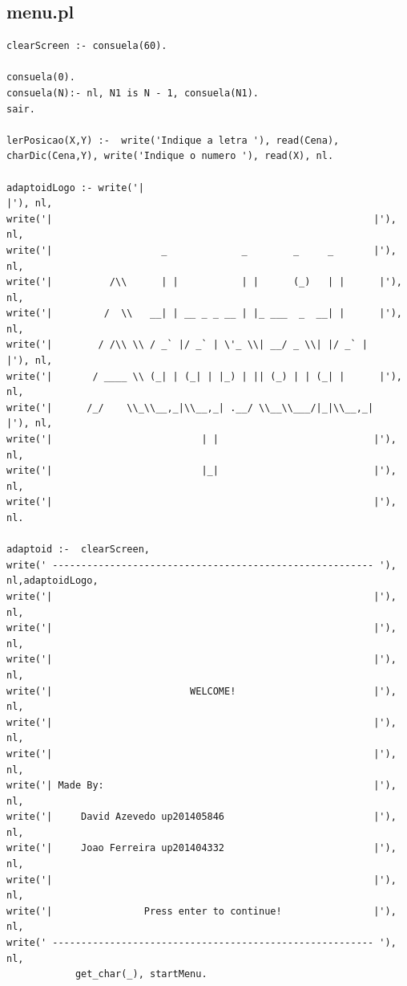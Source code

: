 \documentclass[a4paper]{article}
\begin{document}
\subsection{menu.pl}
\begin{lstlisting}
clearScreen :- consuela(60).

consuela(0).
consuela(N):- nl, N1 is N - 1, consuela(N1).
sair.

lerPosicao(X,Y) :-  write('Indique a letra '), read(Cena), charDic(Cena,Y), write('Indique o numero '), read(X), nl.

adaptoidLogo :- write('|                                                        |'), nl,
write('|                                                        |'), nl,
write('|                   _             _        _     _       |'), nl,
write('|          /\\      | |           | |      (_)   | |      |'), nl,
write('|         /  \\   __| | __ _ _ __ | |_ ___  _  __| |      |'), nl,
write('|        / /\\ \\ / _` |/ _` | \'_ \\| __/ _ \\| |/ _` |      |'), nl,
write('|       / ____ \\ (_| | (_| | |_) | || (_) | | (_| |      |'), nl,
write('|      /_/    \\_\\__,_|\\__,_| .__/ \\__\\___/|_|\\__,_|      |'), nl,
write('|                          | |                           |'), nl,
write('|                          |_|                           |'), nl,
write('|                                                        |'), nl.

adaptoid :-  clearScreen,
write(' -------------------------------------------------------- '), nl,adaptoidLogo,
write('|                                                        |'), nl,
write('|                                                        |'), nl,
write('|                                                        |'), nl,
write('|                        WELCOME!                        |'), nl,
write('|                                                        |'), nl,
write('|                                                        |'), nl,
write('| Made By:                                               |'), nl,
write('|     David Azevedo up201405846                          |'), nl,
write('|     Joao Ferreira up201404332                          |'), nl,
write('|                                                        |'), nl,
write('|                Press enter to continue!                |'), nl,
write(' -------------------------------------------------------- '), nl,
            get_char(_), startMenu.


\end{lstlisting}
\end{document}
